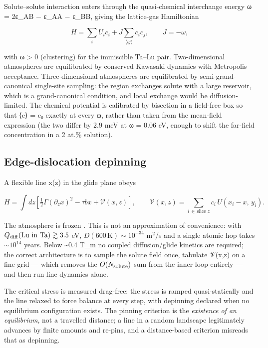 Solute--solute interaction enters through the quasi-chemical interchange energy \cite{guggenheim1952} ω = 2ε\_AB − ε\_AA − ε\_BB, giving the lattice-gas Hamiltonian

\[H = \sum_i U_i c_i + J\sum_{\langle ij\rangle} c_i c_j,\qquad J = -\omega,\]

with ω \textgreater{} 0 (clustering) for the immiscible Ta--Lu pair. Two-dimensional atmospheres are equilibrated by conserved Kawasaki dynamics with Metropolis acceptance. Three-dimensional atmospheres are equilibrated by semi-grand-canonical single-site sampling: the region exchanges solute with a large reservoir, which is a grand-canonical condition, and local exchange would be diffusion-limited. The chemical potential is calibrated by bisection in a field-free box so that ⟨c⟩ = c₀ exactly at every ω, rather than taken from the mean-field expression (the two differ by 2.9 meV at ω = 0.06 eV, enough to shift the far-field concentration in a 2 at.\% solution).

\hypertarget{edge-dislocation-depinning}{%
\subsection{Edge-dislocation depinning}\label{sec:edge-dislocation-depinning}}

A flexible line x(z) in the glide plane obeys

\[H = \int\!dz\left[\tfrac12\Gamma(\partial_z x)^2 - \tau b x + \mathcal{V}(x,z)\right],\qquad \mathcal{V}(x,z) = \sum_{i\,\in\,\text{slice }z} c_i\,U(x_i - x,\,y_i).\]

The atmosphere is frozen \cite{cottrell1949}. This is not an approximation of convenience: with \(Q_{\rm diff}(\mathrm{Lu\ in\ Ta})\gtrsim3.5\) eV, \(D(600\,\mathrm{K})\sim10^{-34}\) m\(^2\)/s and a single atomic hop takes \(\sim10^{14}\) years. Below \textasciitilde0.4 T\_m no coupled diffusion/glide kinetics are required; the correct architecture is to sample the solute field once, tabulate 𝒱(x,z) on a fine grid --- which removes the \(O(N_{\rm solute})\) sum from the inner loop entirely --- and then run line dynamics alone.

The critical stress is measured drag-free: the stress is ramped quasi-statically and the line relaxed to force balance at every step, with depinning declared when no equilibrium configuration exists. The pinning criterion is the \emph{existence of an equilibrium}, not a travelled distance; a line in a random landscape legitimately advances by finite amounts and re-pins, and a distance-based criterion misreads that as depinning.

